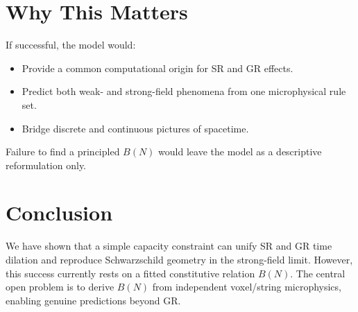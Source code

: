 \documentclass[12pt]{article}
\begin{document}
\section{Why This Matters}
If successful, the model would:
\begin{itemize}
\item Provide a common computational origin for SR and GR effects.
\item Predict both weak- and strong-field phenomena from one microphysical rule set.
\item Bridge discrete and continuous pictures of spacetime.
\end{itemize}
Failure to find a principled $B(N)$ would leave the model as a descriptive reformulation only.

\section*{Conclusion}
We have shown that a simple capacity constraint can unify SR and GR time dilation and reproduce Schwarzschild geometry in the strong-field limit.  
However, this success currently rests on a fitted constitutive relation $B(N)$.  
The central open problem is to derive $B(N)$ from independent voxel/string microphysics, enabling genuine predictions beyond GR.
\end{document}
